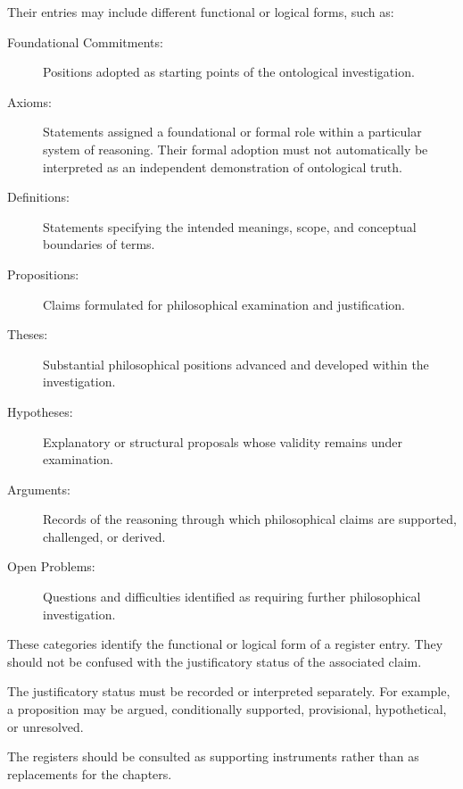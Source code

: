 Their entries may include different
functional or logical forms, such as:

\begin{description}

    \item[Foundational Commitments:]
    Positions adopted as starting points
    of the ontological investigation.

    \item[Axioms:]
    Statements assigned a foundational
    or formal role within a particular
    system of reasoning. Their formal
    adoption must not automatically be
    interpreted as an independent
    demonstration of ontological truth.

    \item[Definitions:]
    Statements specifying the intended
    meanings, scope, and conceptual
    boundaries of terms.

    \item[Propositions:]
    Claims formulated for philosophical
    examination and justification.

    \item[Theses:]
    Substantial philosophical positions
    advanced and developed within the
    investigation.

    \item[Hypotheses:]
    Explanatory or structural proposals
    whose validity remains under
    examination.

    \item[Arguments:]
    Records of the reasoning through
    which philosophical claims are
    supported, challenged, or derived.

    \item[Open Problems:]
    Questions and difficulties identified
    as requiring further philosophical
    investigation.

\end{description}

These categories identify the functional
or logical form of a register entry.
They should not be confused with the
justificatory status of the associated
claim.

The justificatory status must be recorded
or interpreted separately. For example,
a proposition may be argued, conditionally
supported, provisional, hypothetical,
or unresolved.

The registers should be consulted as
supporting instruments rather than
as replacements for the chapters.


